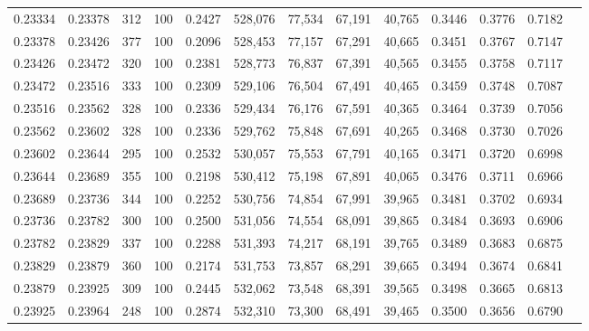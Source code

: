 \begin{tabular}{rrrrrrrrrrrrr}
0.23334 & 0.23378 &   312 & 100 &                                     0.2427 & 528,076 &  77,534 &  67,191 &  40,765 & 0.3446 & 0.3776 & 0.7182 \\
0.23378 & 0.23426 &   377 & 100 &                                     0.2096 & 528,453 &  77,157 &  67,291 &  40,665 & 0.3451 & 0.3767 & 0.7147 \\
0.23426 & 0.23472 &   320 & 100 &                                     0.2381 & 528,773 &  76,837 &  67,391 &  40,565 & 0.3455 & 0.3758 & 0.7117 \\
0.23472 & 0.23516 &   333 & 100 &                                     0.2309 & 529,106 &  76,504 &  67,491 &  40,465 & 0.3459 & 0.3748 & 0.7087 \\
0.23516 & 0.23562 &   328 & 100 &                                     0.2336 & 529,434 &  76,176 &  67,591 &  40,365 & 0.3464 & 0.3739 & 0.7056 \\
0.23562 & 0.23602 &   328 & 100 &                                     0.2336 & 529,762 &  75,848 &  67,691 &  40,265 & 0.3468 & 0.3730 & 0.7026 \\
0.23602 & 0.23644 &   295 & 100 &                                     0.2532 & 530,057 &  75,553 &  67,791 &  40,165 & 0.3471 & 0.3720 & 0.6998 \\
0.23644 & 0.23689 &   355 & 100 &                                     0.2198 & 530,412 &  75,198 &  67,891 &  40,065 & 0.3476 & 0.3711 & 0.6966 \\
0.23689 & 0.23736 &   344 & 100 &                                     0.2252 & 530,756 &  74,854 &  67,991 &  39,965 & 0.3481 & 0.3702 & 0.6934 \\
0.23736 & 0.23782 &   300 & 100 &                                     0.2500 & 531,056 &  74,554 &  68,091 &  39,865 & 0.3484 & 0.3693 & 0.6906 \\
0.23782 & 0.23829 &   337 & 100 &                                     0.2288 & 531,393 &  74,217 &  68,191 &  39,765 & 0.3489 & 0.3683 & 0.6875 \\
0.23829 & 0.23879 &   360 & 100 &                                     0.2174 & 531,753 &  73,857 &  68,291 &  39,665 & 0.3494 & 0.3674 & 0.6841 \\
0.23879 & 0.23925 &   309 & 100 &                                     0.2445 & 532,062 &  73,548 &  68,391 &  39,565 & 0.3498 & 0.3665 & 0.6813 \\
0.23925 & 0.23964 &   248 & 100 &                                     0.2874 & 532,310 &  73,300 &  68,491 &  39,465 & 0.3500 & 0.3656 & 0.6790 \\

\end{tabular}
